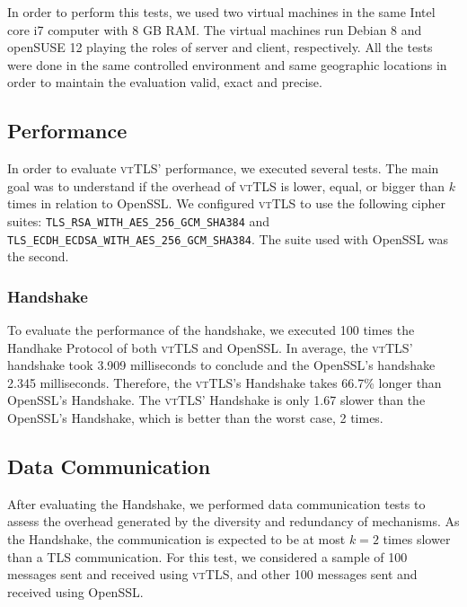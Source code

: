 \documentclass{sig-alternate-05-2015}
\newcommand{\suite}[1]{\texttt{{\footnotesize #1}}}
\begin{document}
In order to perform this tests, we used two virtual machines in the same Intel core i7 computer with 8 GB RAM. The virtual machines run Debian 8 and openSUSE 12 playing the roles of server and client, respectively. All the tests were done in the same controlled environment and same geographic locations in order to maintain the evaluation valid, exact and precise.

\subsection{Performance}


In order to evaluate \textsc{vtTLS}' performance, we executed several tests. The main goal was to understand if the overhead of \textsc{vtTLS} is lower, equal, or bigger than $k$ times in relation to OpenSSL.
We configured \textsc{vtTLS} to use the following cipher suites:
\suite{TLS\_RSA\_WITH\_AES\_256\_GCM\_SHA384} and
\suite{TLS\_ECDH\_ECDSA\_WITH\_AES\_256\_GCM\_SHA384}. The suite used with OpenSSL was the second. 


\subsubsection{Handshake}

To evaluate the performance of the handshake, we executed 100 times the Handhake Protocol of both \textsc{vtTLS} and  OpenSSL.
In average, the \textsc{vtTLS}' handshake took 3.909 milliseconds to conclude and the OpenSSL's handshake 2.345 milliseconds. Therefore, the \textsc{vtTLS}'s Handshake takes 66.7\% longer than OpenSSL's Handshake. The \textsc{vtTLS}' Handshake is only 1.67 slower than the OpenSSL's Handshake, which is better than the worst case, 2 times.


\subsection{Data Communication}

After evaluating the Handshake, we performed data communication tests to assess the overhead generated by the diversity and redundancy of mechanisms. As the Handshake, the communication is expected to be at most $k = 2$ times slower than a TLS communication.
For this test, we considered a sample of 100 messages sent and received using \textsc{vtTLS}, and other 100 messages sent and received using OpenSSL. 
\end{document}

